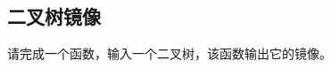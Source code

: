 \documentclass[../../../interview-questions.tex]{subfiles}
\begin{document}
\subsection{二叉树镜像}

请完成一个函数，输入一个二叉树，该函数输出它的镜像。
\end{document}
